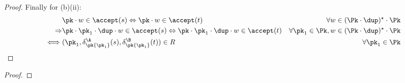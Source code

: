 \begin{proof}
Finally for (b)(ii):
\begin{align*}
            & \pk\cdot w \in\accept(s) \Leftrightarrow \pk\cdot w\in\accept(t) &\forall w\in(\Pk\cdot\dup)^\star\cdot\Pk\\
\Rightarrow & \pk\cdot\pk_1\cdot\dup\cdot w \in\accept(s) \Leftrightarrow \pk\cdot
\pk_1\cdot\dup\cdot w\in\accept(t) &\forall \pk_1\in\Pk, w\in(\Pk\cdot\dup)^\star\cdot\Pk\\
\iff        & (\pk_1, \delta_{\pk{\pk_1}}^{\A}(s), \delta_{\pk{\pk_1}}^{\B}(t))\in R &\forall \pk_1\in\Pk\\
\end{align*}

\end{proof}

\automataexpressions*
\begin{proof}
\end{proof}

